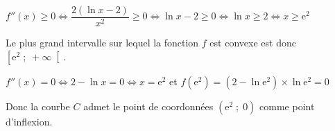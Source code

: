 \documentclass[10pt]{article}
\providecommand{\e}{{\mathrm{e}}}
\begin{document}
\begin{enumerate}
$f''(x)\geqslant0
\iff
\dfrac{2(\ln x-2)}{x^{2}} \geqslant 0
\iff
\ln x - 2\geqslant 0
\iff
\ln x \geqslant 2
\iff
x\geqslant \e^{2}$

Le plus grand intervalle sur lequel la fonction $f$ est convexe est donc
$\left [  \e^{2}\;;\;+\infty\right [$.

$f''(x)=0 \iff 2-\ln x=0 \iff x=\e^{2}$ et
$f(\e^{2})=(2-\ln \e^{2})\times \ln \e^{2}=0$

Donc la courbe $C$ admet le point de coordonnées $(\e^{2}\;;\;0)$ comme point d'inflexion.

\end{enumerate}

\vspace{1cm}
\end{document}
